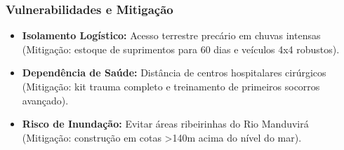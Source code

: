 \subsubsection{Vulnerabilidades e
Mitigação}

\begin{itemize}
\tightlist
\item
  \textbf{Isolamento Logístico:} Acesso terrestre precário em chuvas
  intensas (Mitigação: estoque de suprimentos para 60 dias e veículos
  4x4 robustos).
\item
  \textbf{Dependência de Saúde:} Distância de centros hospitalares
  cirúrgicos (Mitigação: kit trauma completo e treinamento de primeiros
  socorros avançado).
\item
  \textbf{Risco de Inundação:} Evitar áreas ribeirinhas do Rio Manduvirá
  (Mitigação: construção em cotas \textgreater140m acima do nível do
  mar).
\end{itemize}

